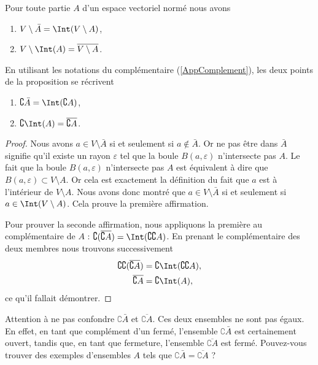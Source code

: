 \begin{proposition}		\label{PropComleIntBar}
	Pour toute partie \( A\) d'un espace vectoriel normé nous avons
	\begin{enumerate}
		\item
		      \( V\setminus\bar A=\Int(V\setminus A)\),
		\item
		      \( V\setminus\Int(A)=\overline{ V\setminus A }\).
	\end{enumerate}
\end{proposition}

En utilisant les notations du complémentaire (\ref{AppComplement}), les deux points de la proposition se récrivent
\begin{enumerate}
	\item
	      \( \complement \bar A=\Int(\complement A)\),
	\item\label{ItemLemPropComplementiv}
	      \( \complement\Int(A)=\overline{ \complement A }\).
\end{enumerate}

\begin{proof}
	Nous avons \( a\in V\setminus\bar A\) si et seulement si \( a\notin\bar A\). Or ne pas être dans \( \bar A\) signifie qu'il existe un rayon \( \varepsilon\) tel que la boule \( B(a,\varepsilon)\) n'intersecte pas \( A\). Le fait que la boule \( B(a,\varepsilon)\) n'intersecte pas \( A\) est équivalent à dire que \( B(a,\varepsilon)\subset V\setminus A\). Or cela est exactement la définition du fait que \( a\) est à l'intérieur de \( V\setminus A\). Nous avons donc montré que \( a\in V\setminus \bar A\) si et seulement si \( a\in\Int(V\setminus A)\). Cela prouve la première affirmation.

	Pour prouver la seconde affirmation, nous appliquons la première au complémentaire de \( A\) : \( \complement(\overline{ \complement A })=\Int(\complement\complement A)\). En prenant le complémentaire des deux membres nous trouvons successivement
	\begin{equation}
		\begin{aligned}[]
			\complement\complement(\overline{ \complement A }) & =\complement\Int(\complement\complement A), \\
			\overline{ \complement A }                         & =\complement\Int(A),
		\end{aligned}
	\end{equation}
	ce qu'il fallait démontrer.
\end{proof}

Attention à ne pas confondre \( \complement \bar A\) et \( \overline{ \complement A }\). Ces deux ensembles ne sont pas égaux. En effet, en tant que complément d'un fermé, l'ensemble \( \complement \bar A\) est certainement ouvert, tandis que, en tant que fermeture, l'ensemble \( \overline{ \complement A }\) est fermé. Pouvez-vous trouver des exemples d'ensembles \( A\) tels que \( \complement \bar A=\overline{ \complement A }\) ?

